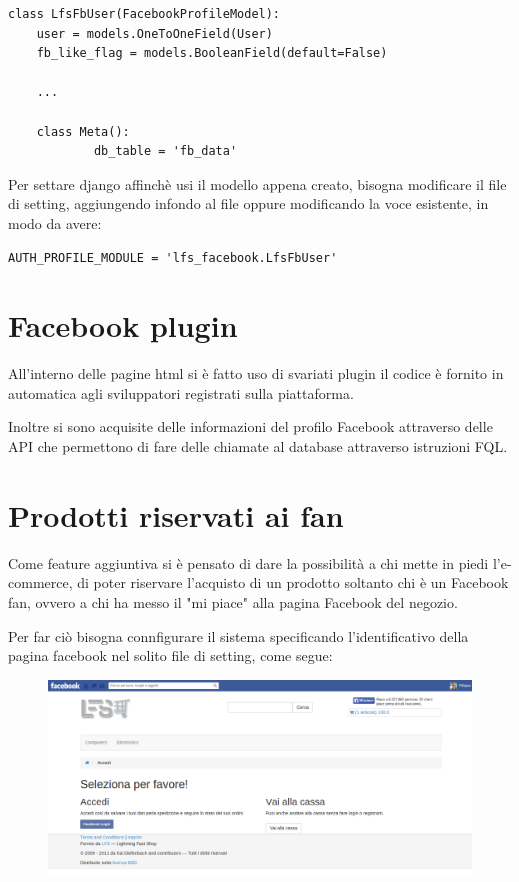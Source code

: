 \begin{shaded}
\begin{lstlisting}
class LfsFbUser(FacebookProfileModel):
    user = models.OneToOneField(User)
    fb_like_flag = models.BooleanField(default=False)
	
	...	
	
    class Meta():
            db_table = 'fb_data'
\end{lstlisting}
\end{shaded}

Per settare django affinchè usi il modello appena creato, bisogna modificare il file di setting, aggiungendo infondo al file oppure modificando la voce esistente, in modo da avere:

\begin{shaded}
\begin{lstlisting}
AUTH_PROFILE_MODULE = 'lfs_facebook.LfsFbUser'
\end{lstlisting}
\end{shaded}

\section{Facebook plugin}
All'interno delle pagine html si è fatto uso di svariati plugin il codice è fornito in automatica agli sviluppatori registrati sulla piattaforma.

Inoltre si sono acquisite delle informazioni del profilo Facebook attraverso delle API che permettono di fare delle chiamate al database attraverso istruzioni FQL.

\section{Prodotti riservati ai fan}
Come feature aggiuntiva si è pensato di dare la possibilità a chi mette in piedi l'e-commerce, di poter riservare l'acquisto di un prodotto soltanto chi è un Facebook fan, ovvero a chi ha messo il "mi piace" alla pagina Facebook del negozio.

Per far ciò bisogna connfigurare il sistema specificando l'identificativo della pagina facebook nel solito file di setting, come segue:

\begin{figure}
\includegraphics[width=0.9\columnwidth]{img/checkout}
\end{figure}

